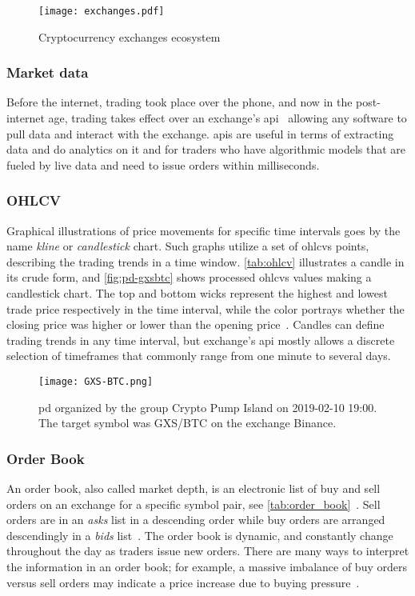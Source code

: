 \begin{figure}[ht]
    \centering
    \texttt{[image: exchanges.pdf]}
    \caption{Cryptocurrency exchanges ecosystem}
\label{fig:exchanges}
\end{figure}

\subsubsection{Market data}
Before the internet, trading took place over the phone, and now in the post-internet age, trading takes effect over an exchange's \ac{api}~\cite{exchange_api} allowing any software to pull data and interact with the exchange. \Acp{api} are useful in terms of extracting data and do analytics on it and for traders who have algorithmic models that are fueled by live data and need to issue orders within milliseconds.

\subsubsection{OHLCV}
Graphical illustrations of price movements for specific time intervals goes by the name \emph{kline} or \emph{candlestick} chart. Such graphs utilize a set of \acp{ohlcv} points, describing the trading trends in a time window. \autoref{tab:ohlcv} illustrates a candle in its crude form, and \autoref{fig:pd-gxsbtc} shows processed \acp{ohlcv} values making a candlestick chart. The top and bottom wicks represent the highest and lowest trade price respectively in the time interval, while the color portrays whether the closing price was higher or lower than the opening price~\cite{P&D_to_the_moon}. Candles can define trading trends in any time interval, but exchange’s \ac{api} mostly allows a discrete selection of timeframes that commonly range from one minute to several days.


\begin{figure}[ht]
    \texttt{[image: GXS-BTC.png]}
    \centering
    \caption{\ac{pd} organized by the group Crypto Pump Island on 2019-02-10 19:00. The target symbol was GXS/BTC on the exchange Binance.}
    \label{fig:pd-gxsbtc}
\end{figure}

\subsubsection{Order Book}
An order book, also called market depth, is an electronic list of buy and sell orders on an exchange for a specific symbol pair, see \autoref{tab:order_book}~\cite{investopedia_depth}. Sell orders are in an \emph{asks} list in a descending order while buy orders are arranged descendingly in a \emph{bids} list~\cite{invest_order_book, coincodex_order_book}. The order book is dynamic, and constantly change throughout the day as traders issue new orders. There are many ways to interpret the information in an order book; for example, a massive imbalance of buy orders versus sell orders may indicate a price increase due to buying pressure~\cite{invest_order_book}.


